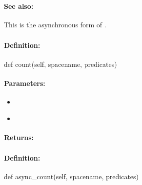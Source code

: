 \paragraph{See also:}  This is the asynchronous form of .

\pagebreak
\subsubsection{}
\label{api:python:count}


\paragraph{Definition:}
\begin{pythoncode}
def count(self, spacename, predicates)
\end{pythoncode}

\paragraph{Parameters:}
\begin{itemize}[noitemsep]
\item {}\\

\item {}\\

\end{itemize}

\paragraph{Returns:}


\pagebreak
\subsubsection{}
\label{api:python:async_count}


\paragraph{Definition:}
\begin{pythoncode}
def async_count(self, spacename, predicates)
\end{pythoncode}

